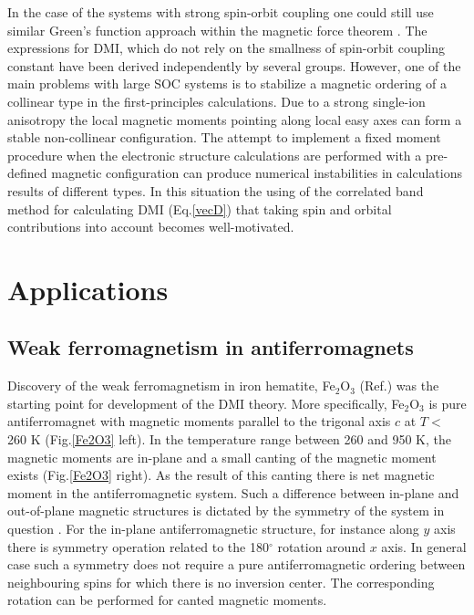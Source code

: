 \documentclass[aps,prl,twocolumn,showpacs,amsmath,amssymb]{revtex4-1}
\begin{document}
In the case of the systems with strong spin-orbit coupling one could still use similar Green's function approach within the magnetic force theorem \cite{katsnelson}.
The expressions for DMI, which do not rely on the smallness of spin-orbit coupling constant have been derived independently by several groups\cite{udvardi,ebert,secchi,mankovsky,kvashnin2020}.
However, one of the main problems with large SOC systems is to stabilize a magnetic ordering of a collinear type in the first-principles calculations.
Due to a strong single-ion anisotropy the local magnetic moments pointing along local easy axes can form a stable non-collinear configuration. The attempt to implement a fixed moment procedure when the electronic structure calculations are performed with a pre-defined magnetic configuration can produce numerical instabilities in calculations results of different types. In this situation the using of the correlated band method for calculating DMI (Eq.\ref{vecD}) that taking spin and orbital contributions into account becomes well-motivated.

\section{Applications}

\subsection{Weak ferromagnetism in antiferromagnets}

Discovery of the weak ferromagnetism in iron hematite, Fe$_2$O$_3$ (Ref.\cite{smith}) was the starting point for development of the DMI theory. More specifically, Fe$_2$O$_3$ is pure antiferromagnet with magnetic moments parallel to the trigonal axis $c$ at $T<$ 260 K (Fig.\ref{Fe2O3} left). In the temperature range between 260 and 950 K, the magnetic moments are in-plane and a small canting of the magnetic moment exists (Fig.\ref{Fe2O3} right). As the result of this canting there is net magnetic moment in the antiferromagnetic system. Such a difference between in-plane and out-of-plane magnetic structures is dictated by the symmetry of the system in question \cite{vonsovsky}. For the in-plane antiferromagnetic structure, for instance along $y$ axis there is symmetry operation related to the 180$^{\circ}$ rotation around $x$ axis. In general case such a symmetry does not require a pure antiferromagnetic ordering between neighbouring spins for which there is no inversion center. The corresponding rotation can be performed for canted magnetic moments.
\end{document}
